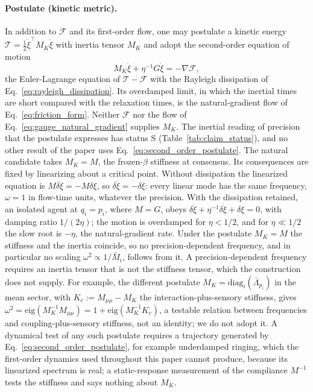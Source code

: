 \documentclass[11pt]{article}
\begin{document}
\paragraph{Postulate (kinetic metric).} In addition to $\mathcal{F}$ and its first-order flow, one may postulate a kinetic energy $\mathcal{T} = \tfrac12 \dot{\xi}^\top M_K \dot{\xi}$ with inertia tensor $M_K$ and adopt the second-order equation of motion
\begin{equation}
M_K\ddot{\xi} + \eta^{-1}G\dot{\xi} = -\nabla\mathcal{F},
\label{eq:second_order_postulate}
\end{equation}
the Euler-Lagrange equation of $\mathcal{T} - \mathcal{F}$ with the Rayleigh dissipation of Eq.~\eqref{eq:rayleigh_dissipation}. Its overdamped limit, in which the inertial times are short compared with the relaxation times, is the natural-gradient flow of Eq.~\eqref{eq:friction_form}. Neither $\mathcal{F}$ nor the flow of Eq.~\eqref{eq:gauge_natural_gradient} supplies $M_K$. The inertial reading of precision that the postulate expresses has status S (Table~\ref{tab:claim_status}), and no other result of the paper uses Eq.~\eqref{eq:second_order_postulate}. The natural candidate takes $M_K = M$, the frozen-$\beta$ stiffness at consensus. Its consequences are fixed by linearizing about a critical point. Without dissipation the linearized equation is $M\delta\ddot{\xi} = -M\delta\xi$, so $\delta\ddot{\xi} = -\delta\xi$: every linear mode has the same frequency, $\omega = 1$ in flow-time units, whatever the precision. With the dissipation retained, an isolated agent at $q_i = p_i$, where $M = G$, obeys $\delta\ddot{\xi} + \eta^{-1}\delta\dot{\xi} + \delta\xi = 0$, with damping ratio $1/(2\eta)$; the motion is overdamped for $\eta < 1/2$, and for $\eta \ll 1/2$ the slow root is $-\eta$, the natural-gradient rate. Under the postulate $M_K = M$ the stiffness and the inertia coincide, so no precision-dependent frequency, and in particular no scaling $\omega^2 \propto 1/\bar{M}_i$, follows from it. A precision-dependent frequency requires an inertia tensor that is not the stiffness tensor, which the construction does not supply. For example, the different postulate $M_K = \mathrm{diag}_i(\bar{\Lambda}_{p_i})$ in the mean sector, with $K_c := M_{\mu\mu} - M_K$ the interaction-plus-sensory stiffness, gives $\omega^2 = \mathrm{eig}(M_K^{-1}M_{\mu\mu}) = 1 + \mathrm{eig}(M_K^{-1}K_c)$, a testable relation between frequencies and coupling-plus-sensory stiffness, not an identity; we do not adopt it. A dynamical test of any such postulate requires a trajectory generated by Eq.~\eqref{eq:second_order_postulate}, for example underdamped ringing, which the first-order dynamics used throughout this paper cannot produce, because its linearized spectrum is real; a static-response measurement of the compliance $M^{-1}$ tests the stiffness and says nothing about $M_K$.
\end{document}
